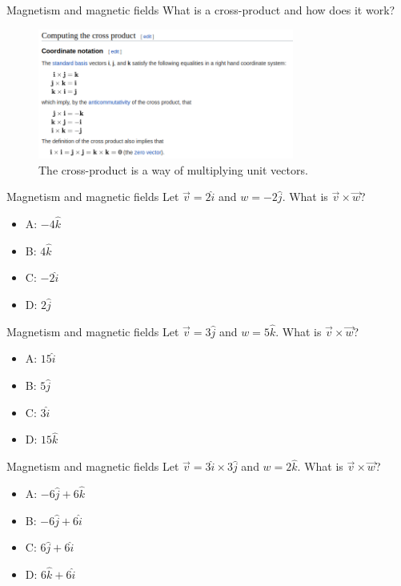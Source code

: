 \documentclass{beamer}
\begin{document}
\begin{frame}{Magnetism and magnetic fields}
What is a cross-product and how does it work? \\ \vspace{0.25cm}
\begin{figure}
\centering
\includegraphics[width=0.75\textwidth]{figures/crossP.png}
\caption{\label{fig:crossP} The cross-product is a way of multiplying unit vectors.}
\end{figure}
\end{frame}

\begin{frame}{Magnetism and magnetic fields}
Let $\vec{v} = 2\hat{i}$ and $w = -2 \hat{j}$.  What is $\vec{v} \times \vec{w}$?
\begin{itemize}
\item A: $-4 \hat{k}$
\item B: $4 \hat{k}$
\item C: $-2 \hat{i}$
\item D: $2 \hat{j}$
\end{itemize}
\end{frame}

\begin{frame}{Magnetism and magnetic fields}
Let $\vec{v} = 3\hat{j}$ and $w = 5 \hat{k}$.  What is $\vec{v} \times \vec{w}$?
\begin{itemize}
\item A: $15 \hat{i}$
\item B: $5 \hat{j}$
\item C: $3 \hat{i}$
\item D: $15 \hat{k}$
\end{itemize}
\end{frame}

\begin{frame}{Magnetism and magnetic fields}
Let $\vec{v} = 3\hat{i} \times 3\hat{j}$ and $w = 2 \hat{k}$.  What is $\vec{v} \times \vec{w}$?
\begin{itemize}
\item A: $-6 \hat{j} + 6\hat{k}$
\item B: $-6 \hat{j} + 6\hat{i}$
\item C: $6 \hat{j} + 6\hat{i}$
\item D: $6 \hat{k} + 6\hat{i}$
\end{itemize}
\end{frame}
\end{document}
